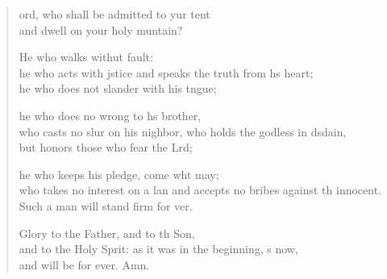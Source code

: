 \begin{verse}
  \begin{patverse}
ord, who shall be admitted to yur tent\Med\\
and dwell on your holy muntain?

He who walks withut fault:\Med\\
he who acts with jstice
and speaks the truth from h\pointup{\i}s heart;\Med\\
he who does not slander with his tngue;

he who does no wrong to h\pointup{\i}s brother,\Med\\
who casts no slur on his nighbor,
who holds the godless in d\pointup{\i}sdain,\Med\\
but honors those who fear the Lrd;

he who keeps his pledge, come wht may;\Med\\
who takes no interest on a lan
and accepts no bribes against th innocent.\Med\\
Such a man will stand firm for ver.

Glory to the Father, and to th Son,\Med\\
and to the Holy Sp\pointup{\i}rit:
as it was in the beginning, \pointup{\i}s now,\Med\\
and will be for ever. Amn.
  \end{patverse}
\end{verse}
